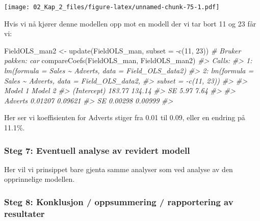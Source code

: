 \documentclass[
]{article}
\newenvironment{Shaded}{\begin{snugshade}}{\end{snugshade}}
\newcommand{\AttributeTok}[1]{\textcolor[rgb]{0.77,0.63,0.00}{#1}}
\newcommand{\CommentTok}[1]{\textcolor[rgb]{0.56,0.35,0.01}{\textit{#1}}}
\newcommand{\DecValTok}[1]{\textcolor[rgb]{0.00,0.00,0.81}{#1}}
\newcommand{\FunctionTok}[1]{\textcolor[rgb]{0.00,0.00,0.00}{#1}}
\newcommand{\NormalTok}[1]{#1}
\newcommand{\OtherTok}[1]{\textcolor[rgb]{0.56,0.35,0.01}{#1}}
\newcommand{\SpecialCharTok}[1]{\textcolor[rgb]{0.00,0.00,0.00}{#1}}
\begin{document}
\texttt{[image: 02\_Kap\_2\_files/figure-latex/unnamed-chunk-75-1.pdf]}

Hvis vi nå kjører denne modellen opp mot en modell der vi tar bort 11 og 23 får vi:

\begin{Shaded}
\begin{Highlighting}[]
\NormalTok{FieldOLS\_man2 }\OtherTok{\textless{}{-}} \FunctionTok{update}\NormalTok{(FieldOLS\_man, }\AttributeTok{subset =} \SpecialCharTok{{-}}\FunctionTok{c}\NormalTok{(}\DecValTok{11}\NormalTok{, }\DecValTok{23}\NormalTok{))}
\CommentTok{\# Bruker pakken: car}
\FunctionTok{compareCoefs}\NormalTok{(FieldOLS\_man, FieldOLS\_man2)}
\CommentTok{\#\textgreater{} Calls:}
\CommentTok{\#\textgreater{} 1: lm(formula = Sales \textasciitilde{} Adverts, data = Field\_OLS\_data2)}
\CommentTok{\#\textgreater{} 2: lm(formula = Sales \textasciitilde{} Adverts, data = Field\_OLS\_data2,}
\CommentTok{\#\textgreater{}    subset = {-}c(11, 23))}
\CommentTok{\#\textgreater{} }
\CommentTok{\#\textgreater{}             Model 1 Model 2}
\CommentTok{\#\textgreater{} (Intercept)  183.77  134.14}
\CommentTok{\#\textgreater{} SE             5.97    7.64}
\CommentTok{\#\textgreater{}                            }
\CommentTok{\#\textgreater{} Adverts     0.01207 0.09621}
\CommentTok{\#\textgreater{} SE          0.00298 0.00999}
\CommentTok{\#\textgreater{} }
\end{Highlighting}
\end{Shaded}

Her ser vi koeffisienten for Adverts stiger fra 0.01 til 0.09, eller en endring på 11.1\%.

\hypertarget{steg-7-eventuell-analyse-av-revidert-modell}{%
\subsubsection{Steg 7: Eventuell analyse av revidert modell}\label{steg-7-eventuell-analyse-av-revidert-modell}}

Her vil vi prinsippet bare gjenta samme analyser som ved analyse av den opprinnelige modellen.

\hypertarget{steg-8-konklusjon-oppsummering-rapportering-av-resultater}{%
\subsubsection{Steg 8: Konklusjon / oppsummering / rapportering av resultater}\label{steg-8-konklusjon-oppsummering-rapportering-av-resultater}}
\end{document}
